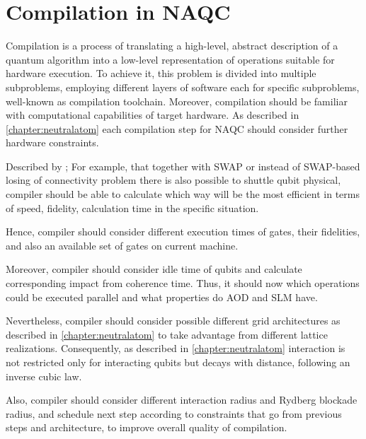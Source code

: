 
\chapter{Compilation in \ac{NAQC}}\label{chapter:compilation}
Compilation is a process of translating a high-level, 
abstract description of a quantum algorithm into a low-level representation of operations suitable for hardware execution.
To achieve it, this problem is divided into multiple subproblems, 
employing different layers of software each for specific subproblems, well-known as compilation toolchain.
Moreover, compilation should be familiar with computational capabilities of target hardware.
As described in \ref{chapter:neutralatom} each compilation step for \ac{NAQC} should consider further hardware constraints.

Described by \parencite{Tan_2025_Enola,Schmid_2024_NeutralAtomBasics}; 
For example, that together with SWAP or instead of SWAP-based losing of connectivity problem
there is also possible to shuttle qubit physical, 
compiler should be able to calculate which way will be the most efficient in terms of speed, fidelity, calculation time in the specific situation.

Hence, compiler should consider different execution times of gates, their fidelities, 
and also an available set of gates on current machine.

Moreover, compiler should consider idle time of qubits and calculate corresponding impact from coherence time.
Thus, it should now which operations could be executed parallel and what properties do \ac{AOD} and \ac{SLM} have.

Nevertheless, compiler should consider possible different grid architectures as described in \ref{chapter:neutralatom} 
to take advantage from different lattice realizations. 
Consequently, as described in \ref{chapter:neutralatom} interaction is not restricted only for interacting qubits but decays with distance, 
following an inverse cubic law.  

Also, compiler should consider different interaction radius and Rydberg blockade radius, 
and schedule next step according to constraints that go from previous steps and architecture, 
to improve overall quality of compilation.


